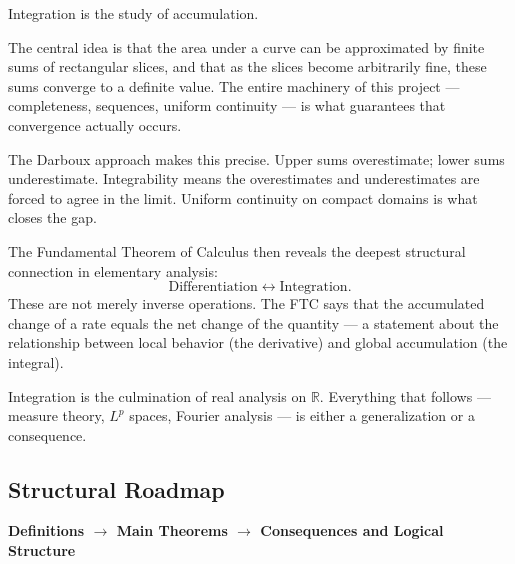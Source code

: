 \begin{tcolorbox}[
  colback=gray!6,
  colframe=gray!40,
  arc=2pt,
  left=8pt, right=8pt, top=6pt, bottom=6pt,
  title={\small\textbf{Structural Role: Accumulation — Infinite Sums with Finite Precision}},
  fonttitle=\small\bfseries
]
Integration is the study of accumulation.

The central idea is that the area under a curve can be approximated
by finite sums of rectangular slices, and that as the slices become
arbitrarily fine, these sums converge to a definite value.
The entire machinery of this project --- completeness,
sequences, uniform continuity --- is what guarantees that
convergence actually occurs.

The Darboux approach makes this precise.
Upper sums overestimate; lower sums underestimate.
Integrability means the overestimates and underestimates are forced
to agree in the limit.
Uniform continuity on compact domains is what closes the gap.

The Fundamental Theorem of Calculus then reveals the deepest
structural connection in elementary analysis:
\[
  \text{Differentiation} \;\longleftrightarrow\; \text{Integration.}
\]
These are not merely inverse operations.
The FTC says that the accumulated change of a rate equals the net
change of the quantity --- a statement about the relationship
between local behavior (the derivative) and global accumulation
(the integral).

Integration is the culmination of real analysis on $\mathbb{R}$.
Everything that follows --- measure theory, $L^p$ spaces,
Fourier analysis --- is either a generalization or a consequence.
\end{tcolorbox}
\vspace{1em}

\subsection*{Structural Roadmap}

\begin{center}
\textbf{Definitions $\longrightarrow$ Main Theorems
$\longrightarrow$ Consequences and Logical Structure}
\end{center}

